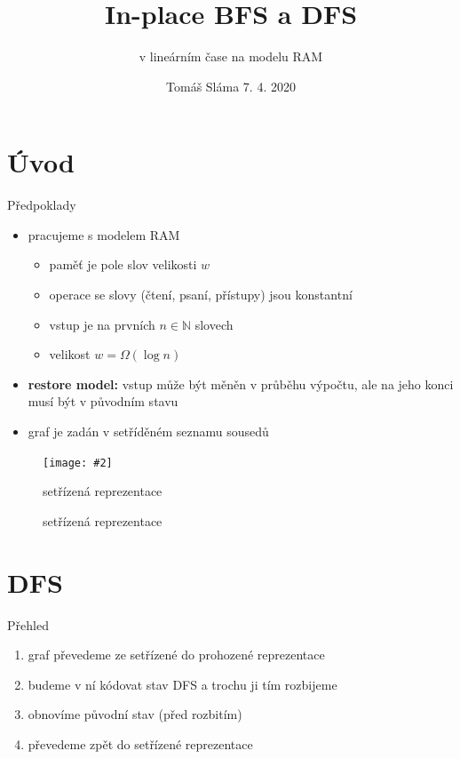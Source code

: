 \documentclass[czech]{beamer}
\title{In-place BFS a DFS}
\subtitle{v lineárním čase na modelu RAM}
\date{Tomáš Sláma \hfill 7. 4. 2020}
\makeatletter
\newcommand{\fitimage}[2][\@nil]{
	\begin{figure}
		\begin{adjustbox}{width=0.9\textwidth, totalheight=\textheight-2\baselineskip-2\baselineskip,keepaspectratio}
			\texttt{[image: \#2]}
		\end{adjustbox}
		\def\tmp{#1}%
	 \ifx\tmp\@nnil
			\else
			\caption{#1}
		\fi
	\end{figure}
}
\makeatother
\begin{document}
	\begin{frame}
		\maketitle
	\end{frame}
	
	\section{Úvod}
	\begin{frame}{Předpoklady}
		\begin{itemize}
			\item pracujeme s modelem RAM
			\begin{itemize}
				\item paměť je pole slov velikosti $w$
				\item operace se slovy (čtení, psaní, přístupy) jsou konstantní
				\item vstup je na prvních $n \in \mathbb{N}$ slovech
				\item velikost $w = \Omega\left(\log n\right)$
			\end{itemize}
			\vfill
			\item \textbf{restore model:} vstup může být měněn v průběhu výpočtu, ale na jeho konci musí být v původním stavu
			\vfill
			\item graf je zadán v setříděném seznamu sousedů
		\end{itemize}

		\fitimage[setřízená reprezentace]{images/sorted.png}
	\end{frame}

	\section{DFS}

	\begin{frame}{Přehled}
		\begin{enumerate}
			\item graf převedeme ze setřízené do prohozené reprezentace
			\item budeme v ní kódovat stav DFS a trochu ji tím rozbijeme
			\item obnovíme původní stav (před rozbitím)
			\item převedeme zpět do setřízené reprezentace
		\end{enumerate}
	\end{frame}
\end{document}
